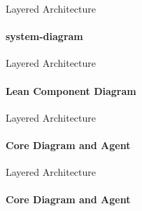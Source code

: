 \begin{frame}{Layered Architecture}
    \framesubtitle{system-diagram}


    \centering
    
    \label{fig:system-container}
\end{frame}

\begin{frame}{Layered Architecture}
    \framesubtitle{Lean Component Diagram}


    \centering
    
    \label{fig:component-diagram-lean}
\end{frame}

\begin{frame}{Layered Architecture}
    \framesubtitle{Core Diagram and Agent}


    \centering
    
    \label{fig:core-diagram}
\end{frame}

\begin{frame}{Layered Architecture}
    \framesubtitle{Core Diagram and Agent}


    \centering
    
    \label{fig:agent-diagram}
\end{frame}
